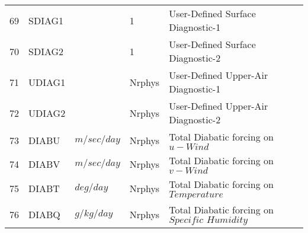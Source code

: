\begin{tabular}{lllll}
69 & SDIAG1   &             &    1  
         &\begin{minipage}[t]{3in}
          {User-Defined Surface Diagnostic-1} 
         \end{minipage}\\
70 & SDIAG2   &             &    1  
         &\begin{minipage}[t]{3in}
          {User-Defined Surface Diagnostic-2} 
         \end{minipage}\\
71 & UDIAG1   &             &    Nrphys
         &\begin{minipage}[t]{3in}
          {User-Defined Upper-Air Diagnostic-1} 
         \end{minipage}\\
72 & UDIAG2   &             &    Nrphys
         &\begin{minipage}[t]{3in}
          {User-Defined Upper-Air Diagnostic-2} 
         \end{minipage}\\
73 & DIABU    & $m/sec/day$ &    Nrphys
         &\begin{minipage}[t]{3in}
          {Total Diabatic forcing on $u-Wind$} 
         \end{minipage}\\
74 & DIABV    & $m/sec/day$ &    Nrphys
         &\begin{minipage}[t]{3in}
          {Total Diabatic forcing on $v-Wind$} 
         \end{minipage}\\
75 & DIABT    & $deg/day$ &    Nrphys
         &\begin{minipage}[t]{3in}
          {Total Diabatic forcing on $Temperature$} 
         \end{minipage}\\
76 & DIABQ    & $g/kg/day$ &    Nrphys
         &\begin{minipage}[t]{3in}
          {Total Diabatic forcing on $Specific \, \, Humidity$} 
         \end{minipage}\\

\end{tabular}
\vfill

